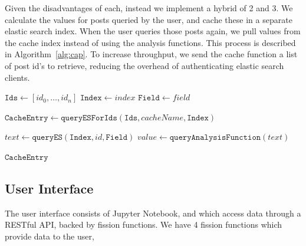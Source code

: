 \documentclass[]{article}
\numberwithin{equation}{section}
\begin{document}
Given the disadvantages of each, instead we implement a hybrid of 2 and 3.
We calculate the values for posts queried by the user, and cache these in a separate elastic search index. 
When the user queries those posts again, we pull values from the cache index instead of using the analysis functions.
This process is described in Algorithm~\ref{alg:cap}.
To increase throughput, we send the cache function a list of post id's to retrieve, reducing the overhead of authenticating elastic search clients.

\begin{algorithm}
    \caption{Caching Analysis Results}\label{alg:cap}
    \begin{algorithmic}
        \State $ \texttt{Ids} \gets [id_0, \dots, id_n] $ 
        \State $ \texttt{Index} \gets index $ 
        \State $ \texttt{Field} \gets field $ 

        \State $ \texttt{CacheEntry} \gets \texttt{queryESForIds}(\texttt{Ids}, cacheName, \texttt{Index}) $ 

                \State $ text \gets \texttt{queryES}(\texttt{Index}, id, \texttt{Field}) $ 
                \State $ value \gets \texttt{queryAnalysisFunction}(text) $ 
                \State {} 
                \State {}
            \EndIf
        \EndFor

        \State \Return $ \texttt{CacheEntry} $
    \end{algorithmic}
\end{algorithm}

\subsection*{User Interface}

The user interface consists of Jupyter Notebook, and which access data through a RESTful API, backed by fission functions.
We have 4 fission functions which provide data to the user,
\end{document}
